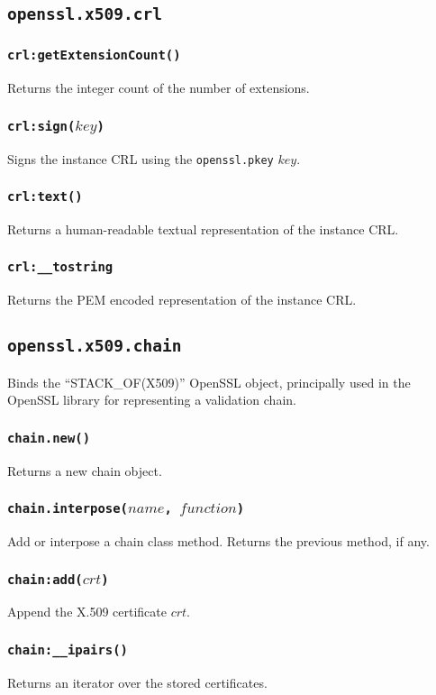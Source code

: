 \documentclass[11pt, oneside]{memoir}
\newcommand*{\fn}[1]{\texttt{#1}\xspace}
\newcommand*{\module}[1]{\texttt{#1}\xspace}
\newcounter{toccols}
\newenvironment{Module}[1]{
	\subsection{\texttt{#1}}
	\addtocontents{toc}{
		\protect\begin{multicols}{\value{toccols}}
	}
}{
	\addtocontents{toc}{\protect\end{multicols}}
}
\begin{document}
\begin{Module}{openssl.x509.crl}
\subsubsection[\fn{crl:getExtensionCount}]{\fn{crl:getExtensionCount()}}

Returns the integer count of the number of extensions.

\subsubsection[\fn{crl:sign}]{\fn{crl:sign($key$)}}

Signs the instance CRL using the \module{openssl.pkey} $key$.

\subsubsection[\fn{crl:text}]{\fn{crl:text()}}

Returns a human-readable textual representation of the instance CRL.

\subsubsection[\fn{crl:\_\_tostring}]{\fn{crl:\_\_tostring}}

Returns the PEM encoded representation of the instance CRL.

\end{Module}


\begin{Module}{openssl.x509.chain}

Binds the ``STACK\_OF(X509)'' OpenSSL object, principally used in the OpenSSL library for representing a validation chain.

\subsubsection[\fn{chain.new}]{\fn{chain.new()}}

Returns a new chain object.

\subsubsection[\fn{chain.interpose}]{\fn{chain.interpose($name$, $function$)}}

Add or interpose a chain class method. Returns the previous method, if any.

\subsubsection[\fn{chain:add}]{\fn{chain:add($crt$)}}

Append the X.509 certificate $crt$.

\subsubsection[\fn{chain:\_\_ipairs}]{\fn{chain:\_\_ipairs()}}

Returns an iterator over the stored certificates.

\end{Module}
\end{document}

